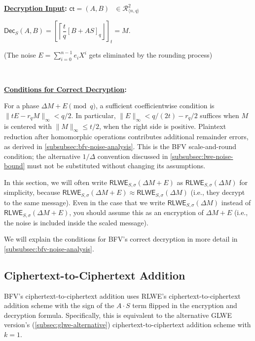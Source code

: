 \begin{tcolorbox}[title={\textbf{\tboxlabel{\ref*{subsec:bfv-enc-dec}} BFV Encryption and Decryption}}]
\textbf{\underline{Decryption Input}:} $\textsf{ct} = (A, B) \text{ } \in \mathcal{R}_{\langle n,q \rangle}^2$ 

$\textsf{Dec}_S(A,B)=\left[\left\lceil\dfrac{t}{q}[B+AS]_q\right\rfloor\right]_t=M$.

(The noise $E = \sum\limits_{i=0}^{n-1}e_iX^i$ gets eliminated by the rounding process) 



$ $

\textbf{\underline{Conditions for Correct Decryption}:}

For a phase $\Delta M+E\pmod q$, a sufficient coefficientwise condition is $\|tE-r_qM\|_\infty<q/2$. In particular, $\|E\|_\infty<q/(2t)-r_q/2$ suffices when $M$ is centered with $\|M\|_\infty\leq t/2$, when the right side is positive. Plaintext reduction after homomorphic operations contributes additional remainder errors, as derived in \autoref{subsubsec:bfv-noise-analysis}. This is the BFV scale-and-round condition; the alternative $1/\Delta$ convention discussed in \autoref{subsubsec:lwe-noise-bound} must not be substituted without changing its assumptions.

\end{tcolorbox}


In this section, we will often write $\textsf{RLWE}_{S,\sigma}(\Delta  M + E)$ as $\textsf{RLWE}_{S,\sigma}(\Delta  M)$ for simplicity, because $\textsf{RLWE}_{S,\sigma}(\Delta M + E) \approx \textsf{RLWE}_{S,\sigma}(\Delta M)$ (i.e., they decrypt to the same message). Even in the case that we write $\textsf{RLWE}_{S,\sigma}(\Delta  M)$ instead of $\textsf{RLWE}_{S,\sigma}(\Delta  M + E)$, you should assume this as an encryption of $\Delta  M + E$ (i.e., the noise is included inside the scaled message). 


We will explain the conditions for BFV's correct decryption in more detail in \autoref{subsubsec:bfv-noise-analysis}.



\subsection{Ciphertext-to-Ciphertext Addition}
\label{subsec:bfv-add-cipher}

BFV's ciphertext-to-ciphertext addition uses RLWE's ciphertext-to-ciphertext addition scheme with the sign of the $A\cdot S$ term flipped in the encryption and decryption formula. Specifically, this is equivalent to the alternative GLWE version's (\autoref{subsec:glwe-alternative}) ciphertext-to-ciphertext addition scheme with $k = 1$. 


